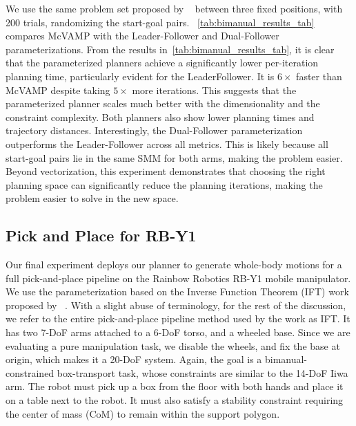 \documentclass[letterpaper, 10 pt, conference]{ieeeconf}
\begin{document}
We use the same problem set proposed by ~\cite{cohn2024constrained} between three fixed positions, with 200 trials, randomizing the start-goal pairs. ~\cref{tab:bimanual_results_tab} compares McVAMP with the Leader-Follower and Dual-Follower parameterizations. From the results in~\cref{tab:bimanual_results_tab}, it is clear that the parameterized planners achieve a significantly lower per-iteration planning time, particularly evident for the LeaderFollower. It is $6\times$ faster than McVAMP despite taking $5\times$ more iterations. This suggests that the parameterized planner scales much better with the dimensionality and the constraint complexity. Both planners also show lower planning times and trajectory distances. 
Interestingly, the Dual-Follower parameterization outperforms the Leader-Follower across all metrics. This is likely because all start-goal pairs lie in the same SMM for both arms, making the problem easier. Beyond vectorization, this experiment demonstrates that choosing the right planning space can significantly reduce the planning iterations, making the problem easier to solve in the new space.




\subsection{Pick and Place for RB-Y1}
\label{expts:ruby}
Our final experiment deploys our planner to generate whole-body motions for a full pick-and-place pipeline on the Rainbow Robotics RB-Y1 mobile manipulator. We use the parameterization based on the Inverse Function Theorem (IFT) work proposed by~\cite{cohn2026planning} . With a slight abuse of terminology, for the rest of the discussion, we refer to the entire pick-and-place pipeline method used by the work as IFT. It has two 7-DoF arms attached to a 6-DoF torso, and a wheeled base. Since we are evaluating a pure manipulation task, we disable the wheels, and fix the base at origin, which makes it a 20-DoF system. Again, the goal is a bimanual-constrained box-transport task, whose constraints are similar to the 14-DoF Iiwa arm. The robot must pick up a box from the floor with both hands and place it on a table next to the robot. It must also satisfy a stability constraint requiring the center of mass (CoM) to remain within the support polygon.
\end{document}
